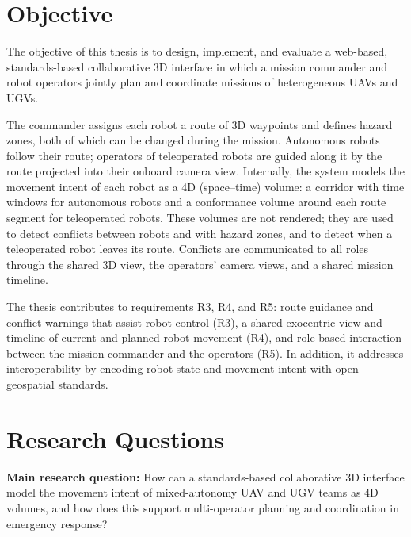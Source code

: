 \documentclass{article}
\begin{document}
\section{Objective}
The objective of this thesis is to design, implement, and evaluate a web-based, standards-based collaborative 3D interface in which a mission commander and robot operators jointly plan and coordinate missions of heterogeneous UAVs and UGVs.

The commander assigns each robot a route of 3D waypoints and defines hazard zones, both of which can be changed during the mission.
Autonomous robots follow their route; operators of teleoperated robots are guided along it by the route projected into their onboard camera view.
Internally, the system models the movement intent of each robot as a 4D (space--time) volume: a corridor with time windows for autonomous robots and a conformance volume around each route segment for teleoperated robots.
These volumes are not rendered; they are used to detect conflicts between robots and with hazard zones, and to detect when a teleoperated robot leaves its route.
Conflicts are communicated to all roles through the shared 3D view, the operators' camera views, and a shared mission timeline.

The thesis contributes to requirements R3, R4, and R5: route guidance and conflict warnings that assist robot control (R3), a shared exocentric view and timeline of current and planned robot movement (R4), and role-based interaction between the mission commander and the operators (R5).
In addition, it addresses interoperability by encoding robot state and movement intent with open geospatial standards.

\section{Research Questions}
\textbf{Main research question:} How can a standards-based collaborative 3D interface model the movement intent of mixed-autonomy UAV and UGV teams as 4D volumes, and how does this support multi-operator planning and coordination in emergency response?
\end{document}
